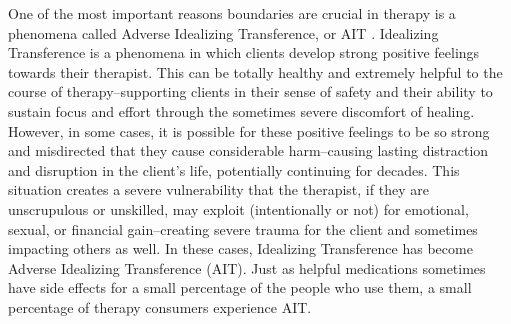 \documentclass[12pt,letterpaper]{book}
\begin{document}
One of the most important reasons boundaries are crucial in therapy is a phenomena called Adverse Idealizing Transference, or AIT \cite{hook2018boundary,transferranceLoveHarm}. Idealizing Transference is a phenomena in which clients develop strong positive feelings towards their therapist. This can be totally healthy and extremely helpful to the course of therapy--supporting clients in their sense of safety and their ability to sustain focus and effort through the sometimes severe discomfort of healing. However, in some cases, it is possible for these positive feelings to be so strong and misdirected that they cause considerable harm--causing lasting distraction and disruption in the client's life, potentially continuing for decades. This situation creates a severe vulnerability that the therapist, if they are unscrupulous or unskilled, may exploit (intentionally or not) for emotional, sexual, or financial gain--creating severe trauma for the client and sometimes impacting others as well. In these cases, Idealizing Transference has become Adverse Idealizing Transference (AIT). Just as helpful medications sometimes have side effects for a small percentage of the people who use them, a small percentage of therapy consumers experience AIT.
\end{document}
